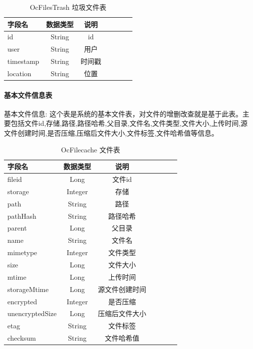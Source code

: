 \begin{table}[htbp]\center
\caption{OcFilesTrash 垃圾文件表}
\begin{tabular}{lcccccl}
    \toprule
    字段名& 数据类型 & 说明 \\
    \midrule
    id         &    String    & id   \\
    user       &    String    & 用户   \\
    timestamp  &    String    & 时间戳   \\
    location   &    String    & 位置   \\
    \bottomrule 
\end{tabular}
\label{trash_table}   
\end{table}

\paragraph{基本文件信息表}
基本文件信息: 这个表是系统的基本文件表，对文件的增删改查就是基于此表。主要包括文件id,存储,路径,路径哈希,父目录,文件名,文件类型,文件大小,上传时间,源文件创建时间,是否压缩,压缩后文件大小,文件标签,文件哈希值等信息。

\begin{table}[htbp]\center
\caption{OcFilecache 文件表}
\begin{tabular}{lcccccl}
    \toprule
    字段名& 数据类型 & 说明 \\
    \midrule
    fileid         & Long  &  文件id \\
    storage        & Integer  &  存储 \\
    path           & String  &   路径\\
    pathHash       & String  &   路径哈希\\
    parent         & Long  &   父目录\\
    name           & String  &   文件名\\
    mimetype       & Integer  &  文件类型\\
    size           & Long  &  文件大小 \\
    mtime          & Long  &  上传时间 \\
    storageMtime   & Long  &  源文件创建时间 \\
    encrypted      & Integer  &  是否压缩 \\
    unencryptedSize& Long  &   压缩后文件大小\\
    etag           & String  &  文件标签 \\
    checksum       & String  &  文件哈希值 \\
    \bottomrule 
\end{tabular}
\label{file_table}   
\end{table}

